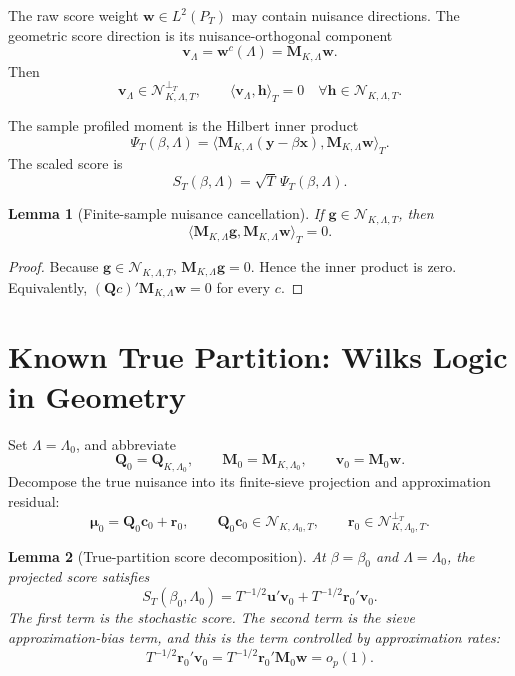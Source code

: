 \documentclass[12pt]{article}
\numberwithin{equation}{section}
\newtheorem{lemma}{Lemma}
\theoremstyle{definition}
\newcommand{\op}{o_p}
\newcommand{\N}{\mathcal N}
\newcommand{\LtwoT}{L^2(P_T)}
\newcommand{\innerT}[2]{\langle #1,#2\rangle_T}
\begin{document}
The raw score weight \(\bm w\in\LtwoT\) may contain nuisance directions. The
geometric score direction is its nuisance-orthogonal component
\[
    \bm v_\Lambda=\bm w^c(\Lambda)=\bm M_{K,\Lambda}\bm w.
\]
Then
\[
    \bm v_\Lambda\in\N_{K,\Lambda,T}^{\perp_T},
    \qquad
    \innerT{\bm v_\Lambda}{\bm h}=0
    \quad \forall \bm h\in\N_{K,\Lambda,T}.
\]

The sample profiled moment is the Hilbert inner product
\begin{equation}
    \Psi_T(\beta,\Lambda)
    =\innerT{\bm M_{K,\Lambda}(\bm y-\beta\bm x)}
      {\bm M_{K,\Lambda}\bm w}.
    \label{eq:sample-profile-moment}
\end{equation}
The scaled score is
\[
    S_T(\beta,\Lambda)=\sqrt T\,\Psi_T(\beta,\Lambda).
\]

\begin{lemma}[Finite-sample nuisance cancellation]
If \(\bm g\in\N_{K,\Lambda,T}\), then
\[
    \innerT{\bm M_{K,\Lambda}\bm g}{\bm M_{K,\Lambda}\bm w}=0.
\]
\end{lemma}

\begin{proof}
Because \(\bm g\in\N_{K,\Lambda,T}\), \(\bm M_{K,\Lambda}\bm g=0\). Hence the
inner product is zero. Equivalently,
\((\bm Qc)'\bm M_{K,\Lambda}\bm w=0\) for every \(c\).
\end{proof}

\section{Known True Partition: Wilks Logic in Geometry}

Set \(\Lambda=\Lambda_0\), and abbreviate
\[
    \bm Q_0=\bm Q_{K,\Lambda_0},
    \qquad
    \bm M_0=\bm M_{K,\Lambda_0},
    \qquad
    \bm v_0=\bm M_0\bm w.
\]
Decompose the true nuisance into its finite-sieve projection and approximation
residual:
\[
    \bm\mu_0=\bm Q_0\bm c_0+\bm r_0,
    \qquad
    \bm Q_0\bm c_0\in\N_{K,\Lambda_0,T},
    \qquad
    \bm r_0\in\N_{K,\Lambda_0,T}^{\perp_T}.
\]

\begin{lemma}[True-partition score decomposition]
\label{lem:true-partition-score-decomposition}
At \(\beta=\beta_0\) and \(\Lambda=\Lambda_0\), the projected score satisfies
\begin{equation}
    S_T(\beta_0,\Lambda_0)
    =T^{-1/2}\bm u'\bm v_0
     +T^{-1/2}\bm r_0'\bm v_0.
    \label{eq:true-partition-score-decomposition}
\end{equation}
The first term is the stochastic score. The second term is the sieve
approximation-bias term, and this is the term controlled by approximation
rates:
\begin{equation}
    T^{-1/2}\bm r_0'\bm v_0
    =T^{-1/2}\bm r_0'\bm M_0\bm w
    =\op(1).
    \label{eq:true-partition-approximation-bias}
\end{equation}
\end{lemma}
\end{document}
